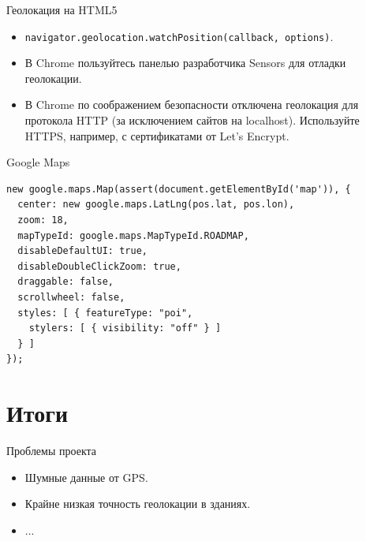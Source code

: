 \documentclass[aspectratio=169,handout,bigger]{beamer}
\begin{document}

\begin{frame}{Геолокация на HTML5}
  \begin{itemize}
    \item \texttt{navigator.geolocation.watchPosition(callback, options)}.
    \item В Chrome пользуйтесь панелью разработчика Sensors для
          отладки геолокации.
    \item В Chrome по соображением безопасности отключена геолокация
          для протокола HTTP (за исключением сайтов на localhost).
          Используйте HTTPS, например, с сертификатами от Let's Encrypt.
  \end{itemize}
\end{frame}


\begin{frame}[fragile]{Google Maps}
\begin{verbatim}
new google.maps.Map(assert(document.getElementById('map')), {
  center: new google.maps.LatLng(pos.lat, pos.lon),
  zoom: 18,
  mapTypeId: google.maps.MapTypeId.ROADMAP,
  disableDefaultUI: true,
  disableDoubleClickZoom: true,
  draggable: false,
  scrollwheel: false,
  styles: [ { featureType: "poi",
    stylers: [ { visibility: "off" } ]
  } ]
});
\end{verbatim}
\end{frame}


\section{Итоги}


\begin{frame}{Проблемы проекта}
  \begin{itemize}
    \item Шумные данные от GPS.
    \item Крайне низкая точность геолокации в зданиях.
    \item ...
  \end{itemize}
\end{frame}
\end{document}
